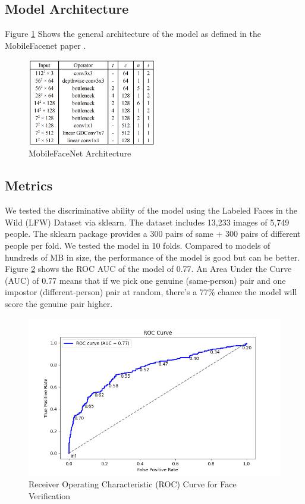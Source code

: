 \subsection{Model Architecture}
Figure \ref{fig:mfn_arch} Shows the general architecture of the model as defined in the MobileFacenet paper \cite{chen2018mobilefacenets}.
\begin{figure}[h] %
	\centering
	\includegraphics[width=0.5\textwidth]{figures/chapter4/mfn_arch.png} %
	\caption{MobileFaceNet Architecture}
	\label{fig:mfn_arch}
\end{figure}

\clearpage 
\subsection{Metrics}
We tested the discriminative ability of the model using the Labeled Faces in the Wild (LFW) Dataset via sklearn. The dataset includes 13,233 images of 5,749 people. The sklearn package provides a 300 pairs of same + 300 pairs of different people per fold. We tested the model in 10 folds.
Compared to models of hundreds of MB in size, the performance of the model is good but can be better. Figure \ref{fig:roc_curve} shows the ROC AUC of the model of 0.77. An Area Under the Curve (AUC) of 0.77 means that if we pick one genuine (same‐person) pair and one impostor (different‐person) pair at random, there’s a 77\% chance the model will score the genuine pair higher.
\begin{figure}[h] %
	\centering
	\includegraphics[width=1\textwidth]{figures/chapter4/roc_curve.png} %
	\caption{Receiver Operating Characteristic (ROC) Curve for Face Verification}
	\label{fig:roc_curve}
\end{figure}

